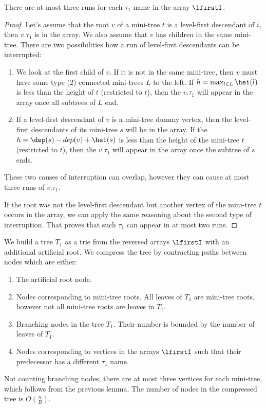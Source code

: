 \begin{lemma}\label{l:level-first-3}
	There are at most three runs for each $\tau_1$ name in the array $\lfirstI$.
\end{lemma}
\begin{proof}
	Let's assume that the root $v$ of a mini-tree $t$ is a level-first descendant of $i$, then $v.\tau_1$ is in the array.
	We also assume that $v$ has children in the same mini-tree.
	There are two possibilities how a run of level-first descendants can be interrupted:
	\begin{enumerate}
		\item We look at the first child of $v$.
		If it is not in the same mini-tree, then $v$ must have some type (2) connected mini-trees $L$ to the left.
		If $h = \max_{l \in L} \hei(l)$ is less than the height of $t$ (restricted to $t$), then the $v.\tau_1$ will appear in the array once all subtrees of $L$ end.
		
		\item If a level-first descendant of $v$ is a mini-tree dummy vertex, then the level-first descendants of its mini-tree $s$ will be in the array.
		If the $h = \dep(s) - dep(v) + \hei(s)$ is less than the height of the mini-tree $t$ (restricted to $t$), then the $v.\tau_1$ will appear in the array once the subtree of $s$ ends.
	\end{enumerate}
	These two causes of interruption can overlap, however they can cause at most three runs of $v.\tau_1$.
	
	If the root was not the level-first descendant but another vertex of the mini-tree $t$ occurs in the array, we can apply the same reasoning about the second type of interruption.
	That proves that such $\tau_1$ can appear in at most two runs.
\end{proof}

\bigbreak

We build a tree $T_1$ as a trie from the reversed arrays $\lfirstI$ with an additional artificial root.
We compress the tree by contracting paths between nodes which are either:
\begin{enumerate}
	\item The artificial root node.
	\item Nodes corresponding to mini-tree roots.
	All leaves of $T_1$ are mini-tree roots, however not all mini-tree roots are leaves in $T_1$.
	\item Branching nodes in the tree $T_1$.
	Their number is bounded by the number of leaves of $T_1$.
	\item Nodes corresponding to vertices in the arrays $\lfirstI$ such that their predecessor has a different $\tau_1$ name.
\end{enumerate}
Not counting branching nodes, there are at most three vertices for each mini-tree, which follows from the previous lemma.
The number of nodes in the compressed tree is $O(\frac{n}{B})$.

